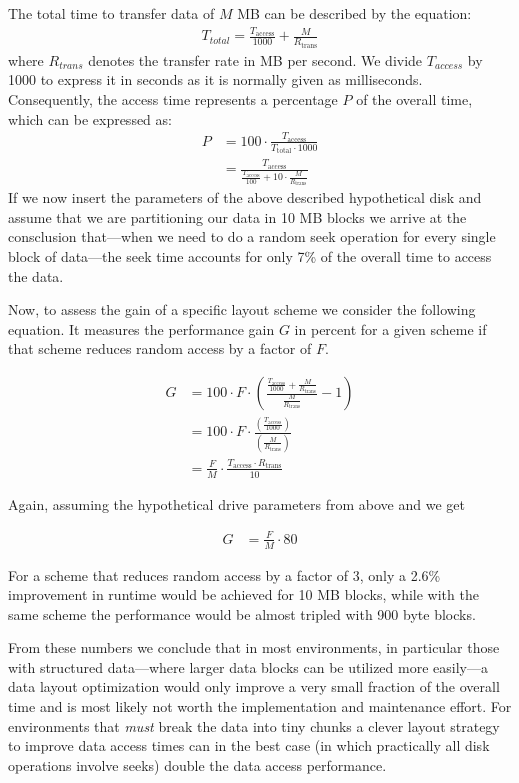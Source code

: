 The total time to transfer data of $M$ MB can
be described by the equation:
\begin{align*}
  T_{total} =  \frac{T_{\text{access}}}{1000} +  \frac{M}{R_{\text{trans}}}
\end{align*}
where $R_{trans}$ denotes the transfer rate in MB per second. 
We divide $T_{access}$  by 1000 to express it in seconds as it is
normally given as milliseconds.
Consequently, the access time represents a percentage $P$ of the overall time,
which can be expressed as:
\begin{align*}
P &= 100 \cdot \frac{T_{\text{access}}}{T_{\text{total}} \cdot 1000}
\\&=  \frac{T_{\text{access}}} {\frac{T_{\text{access}}}{100} +  10 \cdot \frac{M}{R_{\text{trans}}}}
\end{align*}
If we now insert the parameters of the above described hypothetical
disk and assume that we are partitioning our data in 10 MB blocks we
arrive at the consclusion that---when we need to do a random seek
operation for every single block of data---the seek time accounts for
only 7\% of the overall time to access the data.

Now, to assess the gain of a specific layout scheme we consider the following 
equation. It measures the performance gain $G$ in percent for a given scheme if that scheme reduces 
random access by a factor of $F$.

\begin{align*}
G  &= 100 \cdot F \cdot \left( \frac{ \frac{T_{\text{access}}}{1000} + \frac{M}{R_{\text{trans}}} }{\frac{M}{R_{\text{trans}}}}- 1\right)
\\ &= 100 \cdot F \cdot \frac{ \left(\frac{ T_{\text{access}} } {1000}\right)}   { \left(\frac{M}{R_{\text{trans}}}\right)}
\\ &=  \frac{F}{M} \cdot \frac{T_{\text{access}} \cdot {R_{\text{trans}}}  }   { 10 }
\end{align*}

Again, assuming the hypothetical drive parameters from above and we get

\begin{align*}
G  &=   \frac{F}{M} \cdot 80
\end{align*}

For a scheme that reduces random access by a factor of 3, only a 2.6\%
improvement in runtime would be achieved for 10 MB blocks, while with the same scheme
the performance would be almost tripled with 900 byte blocks.

From these numbers we conclude that in most environments, in particular
those with structured data---where larger data blocks can be
utilized more easily---a data layout optimization would only improve
a very small fraction of the overall time and is most likely not worth
the implementation and
maintenance effort. For environments that \emph{must} break the data into
tiny chunks a clever layout strategy to improve data access times can in the
best case (in which practically all disk operations involve seeks) double the
data access performance.

